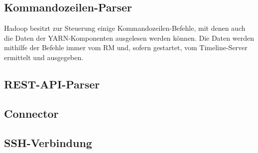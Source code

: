 \subsection{Kommandozeilen-Parser}\label{sec:cmdParser}

Hadoop besitzt zur Steuerung einige Kommandozeilen-Befehle, mit denen \uA auch die Daten der YARN-Komponenten ausgelesen werden können. Die Daten werden mithilfe der Befehle immer vom \ac{RM} und, sofern gestartet, vom Timeline-Server ermittelt und ausgegeben.


\subsection{REST-API-Parser}\label{sec:restParser}


\subsection{Connector}\label{sec:Connector}


\subsection{SSH-Verbindung}\label{sec:sshConnection}

